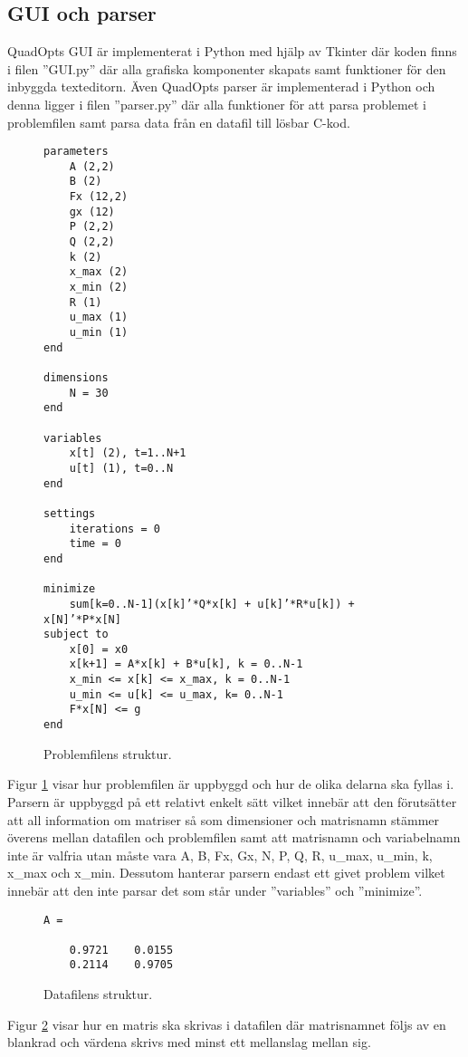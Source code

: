 \subsection{GUI och parser}
QuadOpts GUI är implementerat i Python med hjälp av Tkinter där koden finns i filen ''GUI.py'' där alla grafiska komponenter skapats samt funktioner för den inbyggda texteditorn. Även QuadOpts parser är implementerad i Python och denna ligger i filen ''parser.py'' där alla funktioner för att parsa problemet i problemfilen samt parsa data från en datafil till lösbar C-kod.
\begin{figure}[H]
  \centering
  \begin{verbatim}
parameters
    A (2,2)
    B (2)
    Fx (12,2)
    gx (12)
    P (2,2)
    Q (2,2)
    k (2)
    x_max (2)
    x_min (2)
    R (1)  
    u_max (1)
    u_min (1)
end

dimensions
    N = 30  
end

variables
    x[t] (2), t=1..N+1
    u[t] (1), t=0..N
end

settings
    iterations = 0
    time = 0
end

minimize 
    sum[k=0..N-1](x[k]’*Q*x[k] + u[k]’*R*u[k]) + x[N]’*P*x[N]
subject to
    x[0] = x0
    x[k+1] = A*x[k] + B*u[k], k = 0..N-1
    x_min <= x[k] <= x_max, k = 0..N-1
    u_min <= u[k] <= u_max, k= 0..N-1
    F*x[N] <= g
end
  \end{verbatim}
  \caption{Problemfilens struktur.}
  \label{fig:problemstruktur}
\end{figure}
\noindent Figur \ref{fig:problemstruktur} visar hur problemfilen är uppbyggd och hur de olika delarna ska fyllas i. Parsern är uppbyggd på ett relativt enkelt sätt vilket innebär att den förutsätter att all information om matriser så som dimensioner och matrisnamn stämmer överens mellan datafilen och problemfilen samt att matrisnamn och variabelnamn inte är valfria utan måste vara A, B, Fx, Gx, N, P, Q, R, u\_max, u\_min, k, x\_max och x\_min. Dessutom hanterar parsern endast ett givet problem vilket innebär att den inte parsar det som står under ''variables'' och ''minimize''. 
\begin{figure}[H]
  \centering
  \begin{verbatim}
A =

    0.9721    0.0155
    0.2114    0.9705
  \end{verbatim}
  \caption{Datafilens struktur.}
  \label{fig:datafilstruktur}
\end{figure}
\noindent Figur \ref{fig:datafilstruktur} visar hur en matris ska skrivas i datafilen där matrisnamnet följs av en blankrad och värdena skrivs med minst ett mellanslag mellan sig.
